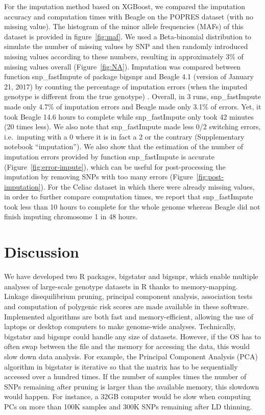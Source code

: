 \documentclass{bioinfo}
\begin{document}
For the imputation method based on XGBoost, we compared  the imputation accuracy and computation times with Beagle on the POPRES dataset (with no missing value). 
The histogram of the minor allele frequencies (MAFs) of this dataset is provided in figure~\ref{fig:maf}. 
We used a Beta-binomial distribution to simulate the number of missing values by SNP and then randomly introduced missing values according to these numbers, resulting in approximately 3\% of missing values overall (Figure~\ref{fig:NA}).
Imputation was compared between function snp\_fastImpute of package bigsnpr and Beagle 4.1 (version of January 21, 2017) 
{\color{red}
by counting the percentage of imputation errors (when the imputed genotype is different from the true genotype)
}.
Overall, in 3 runs, snp\_fastImpute made only 4.7\% of imputation errors and Beagle made only 3.1\% of errors. Yet, it took Beagle 14.6 hours to complete while snp\_fastImpute only took 42 minutes (20 times less). 
{\color{red}
We also note that snp\_fastImpute made less 0/2 switching errors, i.e.\ imputing with a 0 where it is in fact a 2 or the contrary (Supplementary notebook ``imputation'').
We also show that the estimation of the number of imputation errors provided by function snp\_fastImpute is accurate (Figure~\ref{fig:error-impute}), which can be useful for post-processing the imputation by removing SNPs with too many errors (Figure~\ref{fig:post-imputation}).
}
For the Celiac dataset in which there were already missing values, in order to further compare computation times, we report that snp\_fastImpute took less than 10 hours to complete for the whole genome whereas Beagle did not finish imputing chromosome 1 in 48 hours. 


\section{Discussion}

We have developed two R packages, bigstatsr and bigsnpr, which enable multiple analyses of large-scale genotype datasets in R thanks to memory-mapping. Linkage disequilibrium pruning, principal component analysis, association tests and computation of polygenic risk scores are made available in these software. Implemented algorithms are both fast and memory-efficient, allowing the use of laptops or desktop computers to make genome-wide analyses.
Technically, bigstatsr and bigsnpr could handle any size of datasets. However, if the OS has to often swap between the file and the memory for accessing the data, this would slow down data analysis. For example, the Principal Component Analysis (PCA) algorithm in bigstatsr is iterative so that the matrix has to be sequentially accessed over a hundred times. If the number of samples times the number of SNPs remaining after pruning is larger than the available memory, this slowdown would happen. For instance, a 32GB computer would be slow when computing PCs on more than 100K samples and 300K SNPs remaining after LD thinning.
\end{document}
